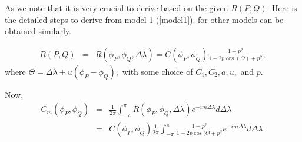 
%
%

As we note that it is very crucial to derive \Cm based on the given $R(P,Q)$. Here is the detailed steps to derive \Cm from model 1 (\ref{model1}). \Cm for other models can be obtained similarly. 


\begin{eqnarray*}
	R(P, Q) &=& R(\phi_P, \phi_Q, \Delta \lambda) = \tilde{C}(\phi_P, \phi_Q) \frac{1-p^2}{1 - 2p \cos(\Theta)+p^2},
\end{eqnarray*}
where $\Theta = \Delta \lambda + u(\phi_P - \phi_Q),$ with some choice of $C_1, C_2, a, u,$ and $p$.

Now,
\begin{eqnarray*}
	C_m(\phi_P, \phi_Q) &=& \frac{1}{2\pi} \int_{-\pi}^\pi R(\phi_P, \phi_Q, \Delta \lambda) e^{-im\Delta \lambda}d\Delta \lambda \\
	&=& \tilde{C}(\phi_P, \phi_Q) \frac{1}{2\pi}\int_{-\pi}^\pi \frac{1-p^2}{1 - 2p \cos(\Theta+p^2} e^{-im\Delta \lambda}d\Delta \lambda.
\end{eqnarray*}

